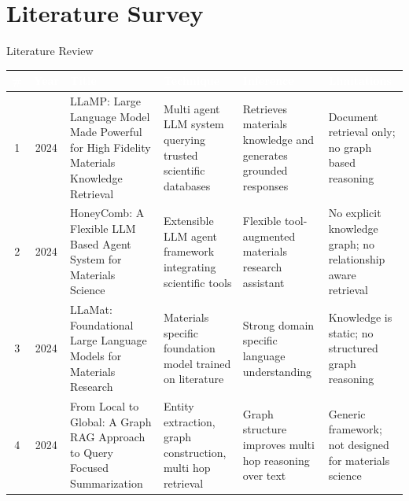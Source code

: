 \documentclass{beamer}
\begin{document}
\section{Literature Survey}
\begin{frame}{Literature Review}
\scriptsize
\setlength{\tabcolsep}{3pt}
\renewcommand{\arraystretch}{1.25}

\begin{tabular}{|c|c|p{2.8cm}|p{2.5cm}|p{2.4cm}|p{2.2cm}|}
\hline
\rowcolor{blue!70}
\textcolor{white}{\textbf{\#}} &
\textcolor{white}{\textbf{Year}} &
\textcolor{white}{\textbf{Title}} &
\textcolor{white}{\textbf{Technique}} &
\textcolor{white}{\textbf{Inference}} &
\textcolor{white}{\textbf{Limitations}} \\
\hline

\rowcolor{blue!8}
1 & 2024 &
LLaMP: Large Language Model Made Powerful for High Fidelity Materials Knowledge Retrieval &
Multi agent LLM system querying trusted scientific databases &
Retrieves materials knowledge and generates grounded responses &
Document retrieval only; no graph based reasoning \\
\hline

2 & 2024 &
HoneyComb: A Flexible LLM Based Agent System for Materials Science &
Extensible LLM agent framework integrating scientific tools &
Flexible tool-augmented materials research assistant &
No explicit knowledge graph; no relationship aware retrieval \\
\hline

\rowcolor{blue!8}
3 & 2024 &
LLaMat: Foundational Large Language Models for Materials Research &
Materials specific foundation model trained on literature &
Strong domain specific language understanding &
Knowledge is static; no structured graph reasoning \\
\hline

4 & 2024 &
From Local to Global: A Graph RAG Approach to Query Focused Summarization &
Entity extraction, graph construction, multi hop retrieval &
Graph structure improves multi hop reasoning over text &
Generic framework; not designed for materials science \\
\hline

\end{tabular}
\end{frame}
\end{document}
